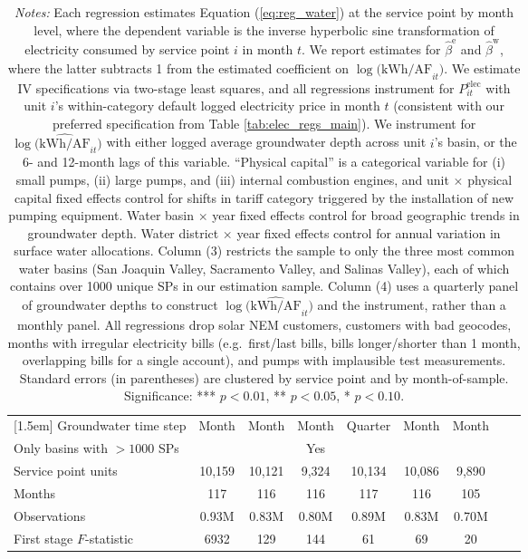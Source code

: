 \begin{table}[t!]
\begin{adjustbox}{center}
\begin{tabular}{lcccccccc}
[1.5em] 
Groundwater time step & Month & Month & Month & Quarter & Month & Month  \\ 
[0.1em] 
Only basins with $>1000$ SPs &  &  & Yes &  &  &   \\ 
[1.5em] 
Service point units & 10,159 & 10,121 & 9,324 & 10,134 & 10,086 & 9,890  \\ 
[0.1em] 
Months  & 117 & 116 & 116 & 117 & 116 & 105 \\ 
[0.1em] 
Observations & 0.93M & 0.83M & 0.80M & 0.89M & 0.83M & 0.70M \\ 
[0.1em] 
First stage $F$-statistic & 6932 & 129 & 144 & 61 & 69 & 20 \\ 
[0.15em]
\hline
\end{tabular}
\end{adjustbox}
\captionsetup{width=\textwidth}
\caption*{\scriptsize \emph{Notes:} 
Each regression estimates Equation (\ref{eq:reg_water}) at the service point by month level,
where the dependent variable is the inverse hyperbolic sine transformation 
of electricity consumed by service point $i$ in month $t$.
We report estimates for $\hat\beta^{\text{e}}$ and $\hat\beta^{\text{w}}$, where the latter subtracts 
1 from the estimated coefficient on $\log \big(\widehat{\text{kWh}\big/\text{AF}}_{it}\big)$.
We estimate IV specifications via two-stage least squares, and all regressions instrument 
for $P^{\text{elec}}_{it}$ with unit $i$'s within-category default logged electricity price 
in month $t$ (consistent with our preferred specification from Table \ref{tab:elec_regs_main}).
We instrument for $\log \big(\widehat{\text{kWh}\big/\text{AF}}_{it}\big)$ with either logged 
average groundwater depth across unit $i$'s basin, or the 6- and 12-month lags of this variable.
``Physical capital'' is a categorical variable for (i) small pumps, (ii) large pumps, and (iii) 
internal combustion engines, and unit $\times$ physical capital fixed effects control for shifts 
in tariff category triggered by the installation of new pumping equipment.
Water basin $\times$ year fixed effects control for broad geographic trends in groundwater depth.
Water district $\times$ year fixed effects control for annual variation in surface water allocations.
Column (3) restricts the sample to only the three most common water basins (San Joaquin Valley, 
Sacramento Valley, and Salinas Valley), each of which contains over 1000 unique SPs in our estimation sample.
Column (4) uses a quarterly panel of groundwater depths to construct $\log \big(\widehat{\text{kWh}\big/\text{AF}}_{it}\big)$ 
and the instrument, rather than a monthly panel.
All regressions drop solar NEM customers, customers with bad geocodes, months with irregular electricity bills 
(e.g.\ first/last bills, bills longer/shorter than 1 month, overlapping bills for a single account),
and pumps with implausible test measurements.
Standard errors (in parentheses) are clustered by service point and by month-of-sample.
Significance: *** $p < 0.01$, ** $p < 0.05$, * $p < 0.10$.
}
\end{table}
